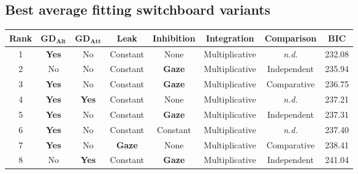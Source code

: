 \documentclass[11pt, a4paper]{article}
\begin{document}
\subsection*{Best average fitting switchboard variants}
\begin{table}[!ht]
\begin{centering}
\begin{tabular}{@{}cccccccc@{}}
\toprule
\textbf{Rank} & $\mathbf{GD_{Alt}}$                 & $\mathbf{GD_{Att}}$                 & \textbf{Leak}                         & \textbf{Inhibition}                   & \textbf{Integration}    & \textbf{Comparison}    & \textbf{BIC}    \\ \midrule
1    & \cellcolor[HTML]{DAE8FC}\textbf{Yes} & No                          & Constant                     & None                         & Multiplicative & \textit{n.d.} & 232.08 \\
2    & No                          & No                          & Constant                     & \cellcolor[HTML]{DAE8FC}\textbf{Gaze} & Multiplicative & Independent   & 235.94 \\
3    & \cellcolor[HTML]{DAE8FC}\textbf{Yes} & No                          & Constant                     & \cellcolor[HTML]{DAE8FC}\textbf{Gaze}                         & Multiplicative & Comparative   & 236.75 \\
4    & \cellcolor[HTML]{DAE8FC}\textbf{Yes} & \cellcolor[HTML]{DAE8FC}\textbf{Yes} & Constant                     & None                         & Multiplicative & \textit{n.d.} & 237.21 \\
5    & \cellcolor[HTML]{DAE8FC}\textbf{Yes} & No                          & Constant                     & \cellcolor[HTML]{DAE8FC}\textbf{Gaze} & Multiplicative & Independent   & 237.31 \\
6    & \cellcolor[HTML]{DAE8FC}\textbf{Yes} & No                          & Constant                     & Constant                     & Multiplicative & \textit{n.d.} & 237.40 \\
7    & \cellcolor[HTML]{DAE8FC}\textbf{Yes} & No                          & \cellcolor[HTML]{DAE8FC}\textbf{Gaze} & None                         & Multiplicative & Comparative   & 238.41 \\
8    & No                          & \cellcolor[HTML]{DAE8FC}\textbf{Yes} & Constant                     & \cellcolor[HTML]{DAE8FC}\textbf{Gaze} & Multiplicative & Independent   & 241.04 \\

\end{tabular}
\end{centering}
\end{table}
\end{document}
